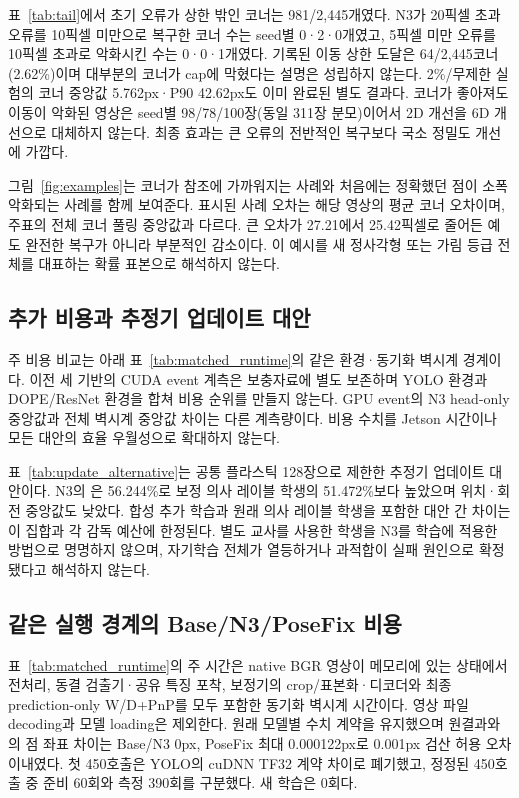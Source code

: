 표~\ref{tab:tail}에서 초기 오류가 상한 밖인 코너는 981/2,445개였다. N3가 20픽셀 초과 오류를 10픽셀 미만으로 복구한 코너 수는 seed별 0·2·0개였고, 5픽셀 미만 오류를 10픽셀 초과로 악화시킨 수는 0·0·1개였다. 기록된 이동 상한 도달은 64/2,445코너(2.62\%)이며 대부분의 코너가 cap에 막혔다는 설명은 성립하지 않는다. 2\%/무제한 실험의 코너 중앙값 5.762px·P90 42.62px도 이미 완료된 별도 결과다. 코너가 좋아져도 이동이 악화된 영상은 seed별 98/78/100장(동일 311장 분모)이어서 2D 개선을 6D 개선으로 대체하지 않는다. 최종 효과는 큰 오류의 전반적인 복구보다 국소 정밀도 개선에 가깝다.


그림~\ref{fig:examples}는 코너가 참조에 가까워지는 사례와 처음에는 정확했던 점이 소폭 악화되는 사례를 함께 보여준다. 표시된 사례 오차는 해당 영상의 평균 코너 오차이며, 주표의 전체 코너 풀링 중앙값과 다르다. 큰 오차가 27.21에서 25.42픽셀로 줄어든 예도 완전한 복구가 아니라 부분적인 감소이다. 이 예시를 새 정사각형 또는 가림 등급 전체를 대표하는 확률 표본으로 해석하지 않는다.


\subsection{추가 비용과 추정기 업데이트 대안}
주 비용 비교는 아래 표~\ref{tab:matched_runtime}의 같은 환경·동기화 벽시계 경계이다. 이전 세 기반의 CUDA event 계측은 보충자료에 별도 보존하며 YOLO 환경과 DOPE/ResNet 환경을 합쳐 비용 순위를 만들지 않는다. GPU event의 N3 head-only 중앙값과 전체 벽시계 중앙값 차이는 다른 계측량이다. 비용 수치를 Jetson 시간이나 모든 대안의 효율 우월성으로 확대하지 않는다.

표~\ref{tab:update_alternative}는 공통 플라스틱 128장으로 제한한 추정기 업데이트 대안이다. N3의 \pckten 은 56.244\%로 보정 의사 레이블 학생의 51.472\%보다 높았으며 위치·회전 중앙값도 낮았다. 합성 추가 학습과 원래 의사 레이블 학생을 포함한 대안 간 차이는 이 집합과 각 감독 예산에 한정된다. 별도 교사를 사용한 학생을 N3를 학습에 적용한 방법으로 명명하지 않으며, 자기학습 전체가 열등하거나 과적합이 실패 원인으로 확정됐다고 해석하지 않는다.


\subsection{같은 실행 경계의 Base/N3/PoseFix 비용}
표~\ref{tab:matched_runtime}의 주 시간은 native BGR 영상이 메모리에 있는 상태에서 전처리, 동결 검출기·공유 특징 포착, 보정기의 crop/표본화·디코더와 최종 prediction-only W/D+PnP를 모두 포함한 동기화 벽시계 시간이다. 영상 파일 decoding과 모델 loading은 제외한다. 원래 모델별 수치 계약을 유지했으며 원결과와의 점 좌표 차이는 Base/N3 0px, PoseFix 최대 0.000122px로 0.001px 검산 허용 오차 이내였다. 첫 450호출은 YOLO의 cuDNN TF32 계약 차이로 폐기했고, 정정된 450호출 중 준비 60회와 측정 390회를 구분했다. 새 학습은 0회다.


